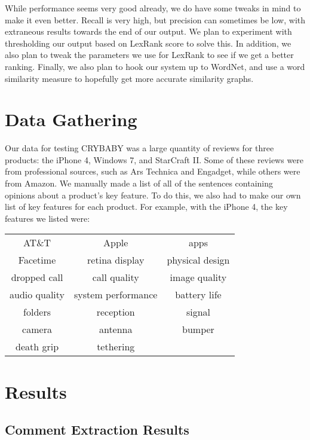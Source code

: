 \documentclass{article}
\begin{document}
While performance seems very good already, we do have some tweaks
in mind to make it even better. Recall is very high, but precision
can sometimes be low, with extraneous results towards the end
of our output. We plan to experiment with thresholding our output
based on LexRank score to solve this. In addition, we also plan to
tweak the parameters we use for LexRank to see if we get a better
ranking. Finally, we also plan to hook our system up to WordNet,
and use a word similarity measure to hopefully get more accurate
similarity graphs.



\section{Data Gathering} %

Our data for testing CRYBABY was a large quantity of reviews for three products:  the iPhone 4, Windows 7, and StarCraft II.  Some of these reviews were from professional sources, such as Ars Technica and Engadget, while others were from Amazon.  We manually made a list of all of the sentences containing opinions about a product's key feature.  To do this, we also had to make our own list of key features for each product.  For example, with the iPhone 4, the key features we listed were:\\\begin{center}\begin{tabular}{ccc}
	AT\&T&Apple&apps\\
	Facetime&retina display&physical design\\
	dropped call&call quality&image quality\\
	audio quality&system performance&battery life\\
	folders&reception&signal\\
	camera&antenna&bumper\\
	death grip&tethering&
\end{tabular}\end{center}


\section{Results} %

\subsection{Comment Extraction Results}
\end{document}
